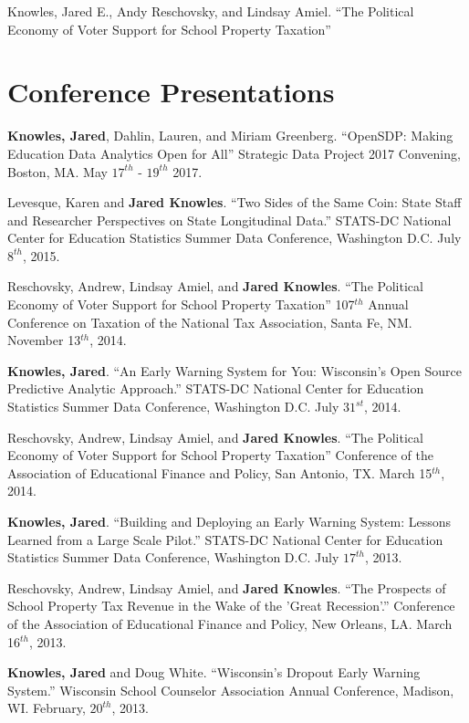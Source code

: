 \documentclass[margin,line]{res}
\begin{document}
\begin{resume}
Knowles, Jared E., Andy Reschovsky, and Lindsay Amiel. ``The Political Economy of 
Voter Support for School Property Taxation'' 


\vspace*{5mm}

\section{\sc Conference Presentations}

\textbf{Knowles, Jared}, Dahlin, Lauren, and Miriam Greenberg. ``OpenSDP: Making 
Education Data Analytics Open for All'' 
Strategic Data Project 2017 Convening, Boston, MA. May $17^{th}$ - $19^{th}$ 2017.

Levesque, Karen and \textbf{Jared Knowles}. ``Two Sides of the Same Coin: State 
Staff and Researcher Perspectives on State Longitudinal Data.'' STATS-DC National Center for Education Statistics Summer Data Conference, Washington D.C. July $8^{th}$, 2015.

Reschovsky, Andrew, Lindsay Amiel, and \textbf{Jared Knowles}. ``The Political Economy of Voter Support for School Property Taxation'' 107$^{th}$ Annual Conference on Taxation of the National Tax Association, Santa Fe, NM. November 13$^{th}$, 2014. 

\textbf{Knowles, Jared}. ``An Early Warning System for You: Wisconsin’s Open Source Predictive Analytic Approach.'' STATS-DC National Center for Education Statistics Summer Data Conference, Washington D.C. July $31^{st}$, 2014.

Reschovsky, Andrew, Lindsay Amiel, and \textbf{Jared Knowles}. ``The Political Economy of Voter Support for School Property Taxation'' Conference of the Association of Educational Finance and Policy, San Antonio, TX. March 15$^{th}$, 2014. 

\textbf{Knowles, Jared}. ``Building and Deploying an Early Warning System: Lessons Learned from a Large Scale Pilot.'' STATS-DC National Center for Education Statistics Summer Data Conference, Washington D.C. July $17^{th}$, 2013.

Reschovsky, Andrew, Lindsay Amiel, and \textbf{Jared Knowles}. ``The Prospects of School Property Tax Revenue in the Wake of the 'Great Recession'.'' Conference of the Association of Educational Finance and Policy, New Orleans, LA. March 16$^{th}$, 2013. 

\textbf{Knowles, Jared} and Doug White. ``Wisconsin's Dropout Early Warning System.'' Wisconsin School Counselor Association Annual Conference, Madison, WI. February, $20^{th}$, 2013. 


\end{resume}
\end{document}
